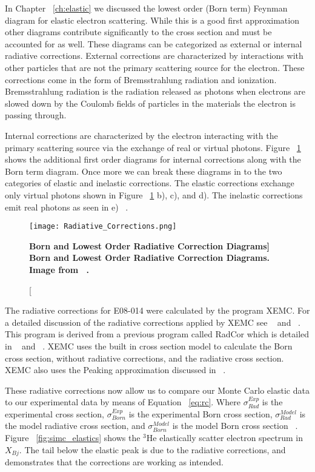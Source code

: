 In Chapter ~\ref{ch:elastic} we discussed the lowest order (Born term) Feynman diagram for elastic electron scattering. While this is a good first approximation other diagrams contribute significantly to the cross section and must be accounted for as well. These diagrams can be categorized as external or internal radiative corrections. External corrections are characterized by interactions with other particles that are not the primary scattering source for the electron. These corrections come in the form of Bremsstrahlung radiation and ionization. Bremsstrahlung radiation is the radiation released as photons when electrons are slowed down by the Coulomb fields of particles in the materials the electron is passing through. 

Internal corrections are characterized by the electron interacting with the primary scattering source via the exchange of real or virtual photons. Figure ~\ref{fig:rc} shows the additional first order diagrams for internal corrections along with the Born term diagram. Once more we can break these diagrams in to the two categories of elastic and inelastic corrections. The elastic corrections exchange only virtual photons shown in Figure ~\ref{fig:rc} b), c), and d). The inelastic corrections emit real photons as seen in e) ~\cite{Thesis:Wang}.

\begin{figure}[!ht]
\begin{center}
\texttt{[image: Radiative\_Corrections.png]}
\end{center}
\caption[\bf{Born and Lowest Order Radiative Correction Diagrams}]{
{\bf{Born and Lowest Order Radiative Correction Diagrams.}} Image from ~\cite{Thesis:Wang}.}
\label{fig:rc}
\end{figure}

The radiative corrections for E08-014 were calculated by the program XEMC. For a detailed discussion of the radiative corrections applied by XEMC see ~\cite{Article:RC} and ~\cite{Article:RC2}. This program is derived from a previous program called RadCor which is detailed in ~\cite{Thesis:Yao} and ~\cite{Thesis:Slifer}. XEMC uses the built in cross section model to calculate the Born cross section, without radiative corrections, and the radiative cross section. XEMC also uses the Peaking approximation discussed in ~\cite{Article:RC2}. 

These radiative corrections now allow us to compare our Monte Carlo elastic data to our experimental data by means of Equation ~\ref{eq:rc}. Where $\sigma^{Exp}_{Rad}$ is the experimental cross section, $\sigma^{Exp}_{Born}$ is the experimental Born cross section, $\sigma^{Model}_{Rad}$ is the model radiative cross section, and $\sigma^{Model}_{Born}$ is the model Born cross section ~\cite{Thesis:Ye}. Figure ~\ref{fig:simc_elastics} shows the $^3$He elastically scatter electron spectrum in $X_{Bj}$. The tail below the elastic peak is due to the radiative corrections, and demonstrates that the corrections are working as intended.

